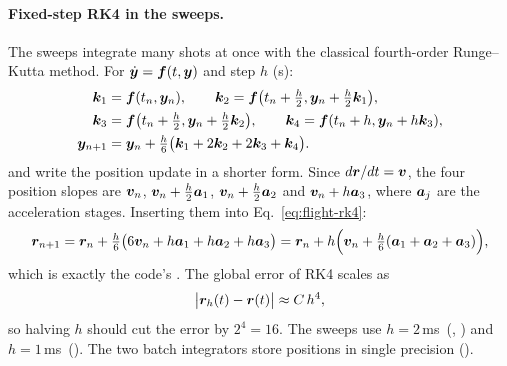 \paragraph{Fixed-step RK4 in the sweeps.}
The sweeps integrate many shots at once with the classical fourth-order Runge--Kutta method.
For $\dot{\bm{y}} = \bm{f}(t,\bm{y})$ and step $h$ (\unit{s}):
\begin{align}
  \bm{k}_1 &= \bm{f}(t_n,\bm{y}_n), \qquad
  \bm{k}_2 = \bm{f}\bigl(t_n+\tfrac h2,\bm{y}_n+\tfrac h2\bm{k}_1\bigr), \nonumber\\
  \bm{k}_3 &= \bm{f}\bigl(t_n+\tfrac h2,\bm{y}_n+\tfrac h2\bm{k}_2\bigr), \qquad
  \bm{k}_4 = \bm{f}(t_n+h,\bm{y}_n+h\bm{k}_3), \nonumber\\
  \bm{y}_{n+1} &= \bm{y}_n + \tfrac{h}{6}\bigl(\bm{k}_1 + 2\bm{k}_2 + 2\bm{k}_3 + \bm{k}_4\bigr). \label{eq:flight-rk4}
\end{align}
 and  write the position update in a
shorter form.
Since $d\bm{r}/dt = \bm{v}$, the four position slopes are $\bm{v}_n$,
$\bm{v}_n+\tfrac h2\bm{a}_1$, $\bm{v}_n+\tfrac h2\bm{a}_2$ and $\bm{v}_n+h\bm{a}_3$, where
$\bm{a}_j$ are the acceleration stages.
Inserting them into Eq.~\eqref{eq:flight-rk4}:
\begin{equation}
  \bm{r}_{n+1}
  = \bm{r}_n + \tfrac h6\bigl(6\bm{v}_n + h\bm{a}_1 + h\bm{a}_2 + h\bm{a}_3\bigr)
  = \bm{r}_n + h\Bigl(\bm{v}_n + \tfrac h6(\bm{a}_1+\bm{a}_2+\bm{a}_3)\Bigr),
  \label{eq:flight-rk4-pos}
\end{equation}
which is exactly the code's .
The global error of RK4 scales as
\begin{equation}
  \bigl|\bm{r}_h(t) - \bm{r}(t)\bigr| \approx C\,h^{4},
  \label{eq:flight-rk4-order}
\end{equation}
so halving $h$ should cut the error by $2^4 = 16$.
The sweeps use $h = 2$\,\unit{ms}\assumed\ (, ) and
$h = 1$\,\unit{ms}\assumed\ ().
The two batch integrators store positions in single precision ().

